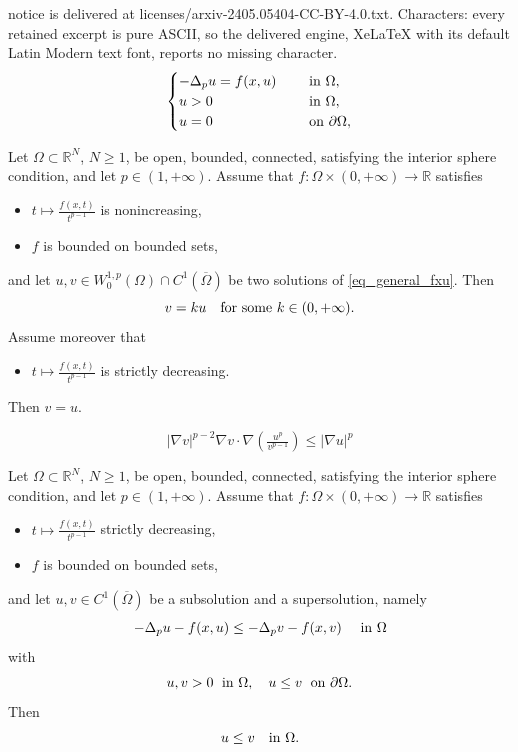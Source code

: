 \documentclass[10pt,a4paper]{amsart}
\newcommand{\R}{\mathbb{R}}
\begin{document}
notice is delivered at licenses/arxiv-2405.05404-CC-BY-4.0.txt. Characters: every retained excerpt is pure ASCII, so the delivered engine, XeLaTeX with its default Latin Modern text font, reports no missing character.
\begin{equation}\label{eq_general_fxu}
\begin{cases}
-\Delta_p u = f(x,u) & \quad \hbox{ in $\Omega$},\\ 
u >0 & \quad \hbox{ in $\Omega$}, \\
u =0 & \quad \hbox{ on $\partial \Omega$},
\end{cases}
\end{equation}

\begin{lemma}
\label{lem_uniquen}
Let $\Omega \subset \R^N$, $N \geq 1$, be open, bounded, connected, satisfying the interior sphere condition, and let $p \in (1,+\infty)$. 
Assume that $f: \Omega \times (0,+\infty) \to \R$ satisfies
\begin{itemize}
\item $t \mapsto \frac{f(x, t)}{t^{p-1}}$ is nonincreasing, 
\item $f$ is bounded on bounded sets,
\end{itemize}
and let $u,v \in W^{1,p}_0(\Omega) \cap C^1(\overline{\Omega})$ be two solutions of
\eqref{eq_general_fxu}. 
Then
$$v = k u \quad \hbox{for some $k \in (0,+\infty)$}.$$
Assume moreover that
\begin{itemize}
\item $t \mapsto \frac{f(x, t)}{t^{p-1}}$ is strictly decreasing.
\end{itemize}
Then $v=u$. 
\end{lemma}

\begin{equation}\label{eq_corol_picone}
|\nabla v|^{p-2} \nabla v \cdot \nabla \left(\tfrac{u^p}{v^{p-1}}\right) \leq |\nabla u|^p
\end{equation}

\begin{lemma}
\label{lem_comp_princip}
Let $\Omega \subset \R^N$, $N \geq 1$, be open, bounded, connected, satisfying the interior sphere condition, and let $p \in (1,+\infty)$. 
Assume that $f: \Omega \times (0,+\infty) \to \R$ satisfies
\begin{itemize}
\item $t \mapsto \frac{f(x, t)}{t^{p-1}}$ strictly decreasing, 
\item $f$ is bounded on bounded sets,
\end{itemize}
and let $u,v \in
 C^1(\overline{\Omega})$ be a subsolution and a supersolution,
namely
$$ -\Delta_p u - f(x,u) \leq -\Delta_p v - f(x,v) \quad \hbox{ in $\Omega$}$$
with 
$$u,v >0 \; \hbox{ in $\Omega$}, \quad u\leq v \; \hbox{ on $\partial \Omega$}.$$
Then
$$u \leq v \quad \hbox{in $\Omega$.}$$
\end{lemma}
\end{document}
